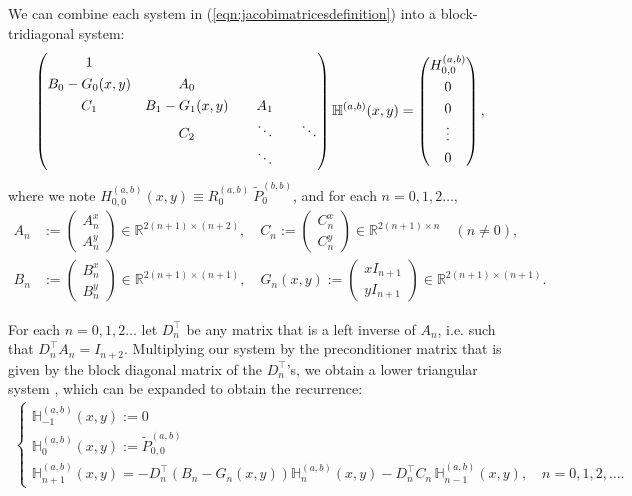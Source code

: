 \documentclass[11pt, oneside]{article}   	%
\newcommand{\R}{\mathbb{R}}
\newcommand{\hdop}{H}
\newcommand{\bighdop}{\mathbb{\hdop}}
\newcommand{\hdopab}{\hdop^{(a,b)}}
\newcommand{\bighdopab}{\bighdop^{(a,b)}}
\newcommand{\Dnt}{D^\top_n}
\newcommand{\jac}{{\tilde P}}
\newcommand{\genjac}{R}
\begin{document}
We can combine each system in (\ref{eqn:jacobimatricesdefinition}) into a block-tridiagonal system:
\begin{align*}
\renewcommand\arraystretch{1.3}
\begin{pmatrix}
		1 & & & \\
		B_0-G_0(x,y) & A_0 & & \\
		C_1 & B_1-G_1(x,y) & \quad A_1 \quad & \\
		& C_2 & \ddots & \ddots \\
		& & \ddots &
\end{pmatrix}
\bighdopab(x,y)
=
\begin{pmatrix}
	\hdopab_{0,0} \\ 0 \\ 0 \\ \vdots \\ 0 \\
\end{pmatrix},
\end{align*}
where we note $\hdopab_{0,0}(x,y) \equiv \genjac_0^{(a,b)} \: \jac_0^{(b,b)}$, and for each $n = 0,1,2\dots$,
\begin{align*}
A_n &:= \begin{pmatrix}
		A^x_n \\
		A^y_n
	    \end{pmatrix} \in \R^{2(n+1)\times(n+2)}, \quad
C_n := \begin{pmatrix}
		C^x_n \\
		C^y_n
	    \end{pmatrix} \in \R^{2(n+1)\times n} \quad (n \ne 0), \nonumber \\
B_n &:= \begin{pmatrix}
		B^x_n \\
		B^y_n
	    \end{pmatrix} \in \R^{2(n+1)\times(n+1)}, \quad
G_n(x,y) := \begin{pmatrix}
		xI_{n+1} \\
		yI_{n+1}
	    \end{pmatrix} \in \R^{2(n+1)\times(n+1)}.
\end{align*}
 
For each $n = 0,1,2\dots$ let $\Dnt$ be any matrix that is a left inverse of $A_n$, i.e. such that $\Dnt A_n = I_{n+2}$. Multiplying our system by the preconditioner matrix that is given by the block diagonal matrix of the $\Dnt$'s, we obtain a lower triangular system \cite[p78]{dunkl2014orthogonal}, which can be expanded to obtain the recurrence:
\begin{align*}
\begin{cases}
\bighdopab_{-1}(x,y) := 0 \\
\bighdopab_{0}(x,y) := \jac^{(a,b)}_{0,0} \\
\bighdopab_{n+1}(x,y) = -\Dnt (B_n-G_n(x,y)) \bighdopab_n(x,y) - \Dnt C_n  \,\bighdopab_{n-1}(x,y), \quad n = 0,1,2,\dots.
\end{cases}
\end{align*}
\end{document}
